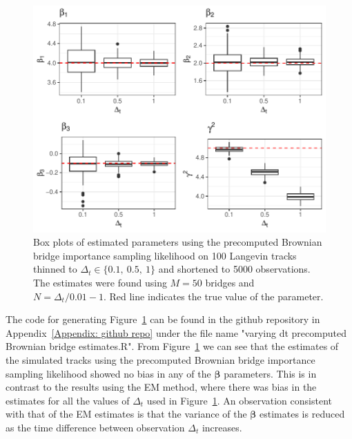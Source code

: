 \begin{figure}[H]
    \centering
    \includegraphics[width=\linewidth]{Images/Results/varying dt estimates precomputed BB.pdf}
    \caption[Box plots of Parameter Estimates using precomputed Brownian bridge importance sampling at different sampling intervals]{Box plots of estimated parameters using the precomputed Brownian bridge importance sampling likelihood on 100 Langevin tracks thinned to $\Delta_t \in \{0.1, \ 0.5, \ 1\}$ and shortened to 5000 observations. The estimates were found using $M=50$ bridges and $N = \Delta_t/0.01 -1$. Red line indicates the true value of the parameter.}
    \label{fig:varying dt boxplot precomputed BB}
\end{figure}


The code for generating Figure~\ref{fig:varying dt boxplot precomputed BB} can be found in the github repository in Appendix~\ref{Appendix: github repo} under the file name "varying dt precomputed Brownian bridge estimates.R". From Figure~\ref{fig:varying dt boxplot precomputed BB} we can see that the estimates of the simulated tracks using the precomputed Brownian bridge importance sampling likelihood showed no bias in any of the $\bm \beta$ parameters. This is in contrast to the results using the EM method, where there was bias in the estimates for all the values of $\Delta_t$ used in Figure~\ref{fig:varying dt boxplot precomputed BB}. An observation consistent with that of the EM estimates is that the variance of the $\bm \beta$ estimates is reduced as the time difference between observation $\Delta_t$ increases. 



